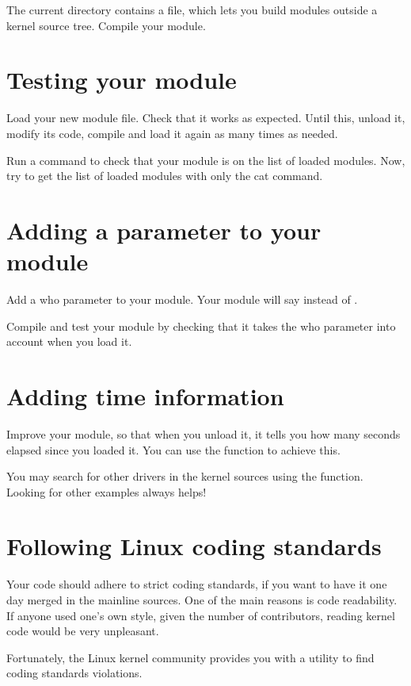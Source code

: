 The current directory contains a  file, which lets you
build modules outside a kernel source tree.  Compile your module.

\section{Testing your module}

Load your new module file. Check that it works as
expected. Until this, unload it, modify its code, compile and load it
again as many times as needed.

Run a command to check that your module is on the list of loaded
modules. Now, try to get the list of loaded modules with only the cat
command.

\section{Adding a parameter to your module}

Add a who parameter to your module. Your module will say  instead of .

 Compile and test your module by checking that it takes the who
parameter into account when you load it.

\section{Adding time information}

Improve your module, so that when you unload it, it tells you how many
seconds elapsed since you loaded it.  You can use the
 function to achieve this.

You may search for other drivers in the kernel sources using the
 function. Looking for other examples always helps!

\section{Following Linux coding standards}

Your code should adhere to strict coding standards, if you want to
have it one day merged in the mainline sources. One of the main
reasons is code readability. If anyone used one's own style, given the
number of contributors, reading kernel code would be very unpleasant.

Fortunately, the Linux kernel community provides you with a utility to
find coding standards violations.

